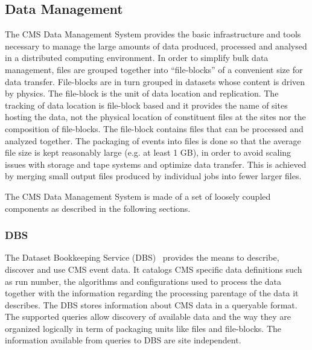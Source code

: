 \subsection{Data Management}
\label{sec:3_1}
The CMS Data Management System provides the basic infrastructure and tools necessary to manage the large amounts of data produced, processed and analysed in a distributed computing environment. 
In order to simplify bulk data management, files are grouped together into “file-blocks”  of a convenient size for data transfer. 
File-blocks are in turn grouped in datasets whose content is driven by physics.
The file-block is the unit of data location and replication. 
The tracking of data location is file-block based and it provides the name of sites hosting the data, not the physical location of constituent files at the sites nor the composition of file-blocks.
The file-block contains files that can be processed and analyzed together.
The packaging of events into files is done so that the average file size is
kept reasonably large (e.g. at least 1 GB), in order to avoid scaling issues with storage and tape systems and optimize data transfer.
This is achieved by merging small output files produced by individual jobs into fewer larger files.


The CMS Data Management System is made of a set of loosely coupled components as described in the following sections.
\subsubsection{DBS}
\label{sec:3_1_1}
The Dataset Bookkeeping Service (DBS)~\cite{RefDBS} provides the means to describe, discover and use CMS event data. 
It catalogs CMS specific data definitions such as run number, the algorithms and configurations used to process the data together with the information regarding the processing parentage of the data it describes.
The DBS stores information about CMS data in a queryable format. The supported queries allow discovery of available data and the way they are organized logically in term of packaging units like files and file-blocks. The information available from queries to DBS are site independent.

